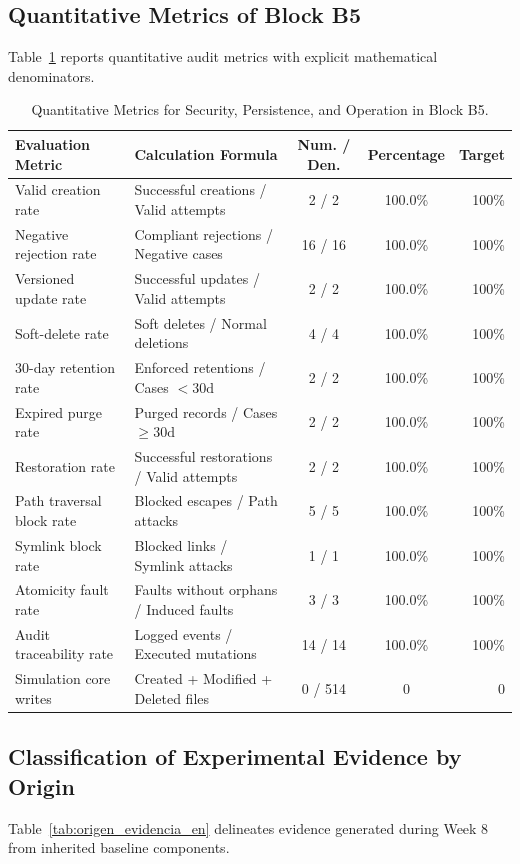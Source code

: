 \documentclass[11pt,a4paper]{article}
\begin{document}
\subsection{Quantitative Metrics of Block B5}
Table~\ref{tab:metricas_b5_en} reports quantitative audit metrics with explicit mathematical denominators.

\begin{table}[H]
\centering
\small
\begin{tabularx}{\textwidth}{p{4.2cm}Xccr}
\toprule
\textbf{Evaluation Metric} & \textbf{Calculation Formula} & \textbf{Num. / Den.} & \textbf{Percentage} & \textbf{Target} \\
\midrule
Valid creation rate & Successful creations / Valid attempts & 2 / 2 & 100.0\% & 100\% \\
Negative rejection rate & Compliant rejections / Negative cases & 16 / 16 & 100.0\% & 100\% \\
Versioned update rate & Successful updates / Valid attempts & 2 / 2 & 100.0\% & 100\% \\
Soft-delete rate & Soft deletes / Normal deletions & 4 / 4 & 100.0\% & 100\% \\
30-day retention rate & Enforced retentions / Cases $<30\text{d}$ & 2 / 2 & 100.0\% & 100\% \\
Expired purge rate & Purged records / Cases $\ge 30\text{d}$ & 2 / 2 & 100.0\% & 100\% \\
Restoration rate & Successful restorations / Valid attempts & 2 / 2 & 100.0\% & 100\% \\
Path traversal block rate & Blocked escapes / Path attacks & 5 / 5 & 100.0\% & 100\% \\
Symlink block rate & Blocked links / Symlink attacks & 1 / 1 & 100.0\% & 100\% \\
Atomicity fault rate & Faults without orphans / Induced faults & 3 / 3 & 100.0\% & 100\% \\
Audit traceability rate & Logged events / Executed mutations & 14 / 14 & 100.0\% & 100\% \\
Simulation core writes & Created + Modified + Deleted files & 0 / 514 & 0 & 0 \\
\bottomrule
\end{tabularx}
\caption{Quantitative Metrics for Security, Persistence, and Operation in Block B5.}
\label{tab:metricas_b5_en}
\end{table}

\subsection{Classification of Experimental Evidence by Origin}
Table~\ref{tab:origen_evidencia_en} delineates evidence generated during Week 8 from inherited baseline components.
\end{document}
